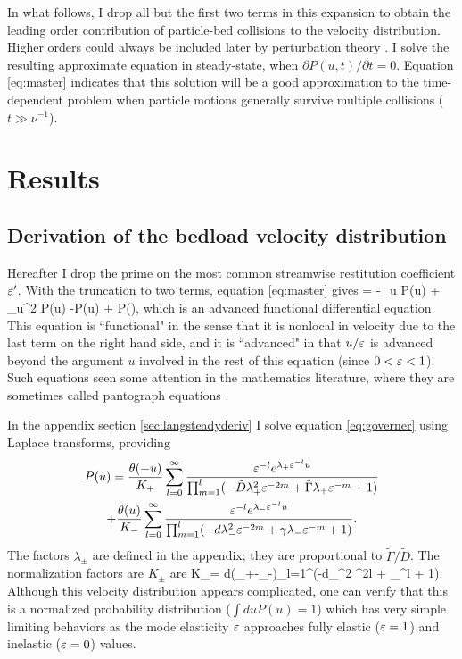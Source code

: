 In what follows, I drop all but the first two terms in this expansion to obtain the leading order contribution of particle-bed collisions to the velocity distribution.
Higher orders could always be included later by perturbation theory \citep{Morse1953}.
I solve the resulting approximate equation in steady-state, when $\partial P(u,t)/\partial t = 0$. Equation \ref{eq:master} indicates that this solution will be a good approximation to the time-dependent problem when particle motions generally survive multiple collisions ($t\gg \nu^{-1}$).

\section{Results}
\label{sec:langresults}

\subsection{Derivation of the bedload velocity distribution}
\label{sec:langsolution}
Hereafter I drop the prime on the most common streamwise restitution coefficient $\varepsilon'$.
With the truncation to two terms, equation \ref{eq:master} gives 
 = -\tilde{\Gamma}\partial_u P(u) + \partial_u^2 P(u) -P(u) +  P\big(\big),\label{eq:governer} \ee
which is an advanced functional differential equation. This equation is ``functional" in the sense that it is nonlocal in velocity due to the last term on the right hand side, and it is ``advanced" in that $u/\varepsilon$ is advanced beyond the argument $u$ involved in the rest of this equation (since $0<\varepsilon<1$).
Such equations seen some attention in the mathematics literature, where they are sometimes called pantograph equations \citep{Hall1989, Kim1998,Zaidi2015}.

In the appendix section \ref{sec:langsteadyderiv} I solve equation \ref{eq:governer} using Laplace transforms, providing
\begin{multline} P(u) = \frac{\theta(-u)}{K_+}\sum_{l=0}^\infty \frac{\varepsilon^{-l}e^{\lambda_+\varepsilon^{-l}u}}{\prod_{m=1}^l(-\tilde{D} \lambda_+^2 \varepsilon^{-2m} + \tilde{\Gamma} \lambda_+ \varepsilon^{-m} + 1) } 
	\\+ \frac{\theta(u)}{K_-}\sum_{l=0}^\infty \frac{\varepsilon^{-l}e^{\lambda_-\varepsilon^{-l}u}}{\prod_{m=1}^l(-d \lambda_-^2 \varepsilon^{-2m} + \gamma \lambda_- \varepsilon^{-m} + 1) } \label{eq:steadystate}. \end{multline}
The factors $\lambda_\pm$ are defined in the appendix; they are proportional to $\tilde{\Gamma}/\tilde{D}$. 
The normalization factors are $K_\pm$ are 
\be K_\pm = d(\lambda_+-\lambda_-)\prod_{l=1}^\infty (-d\lambda_\pm^2 \ve^{2l} + \gamma \lambda_\pm \ve^{l} + 1). \ee
Although this velocity distribution appears complicated, one can verify that this is a normalized probability distribution ($\int du P(u) = 1$) which has very simple limiting behaviors as the mode elasticity $\varepsilon$ approaches fully elastic ($\varepsilon=1$) and inelastic ($\varepsilon = 0$) values.

